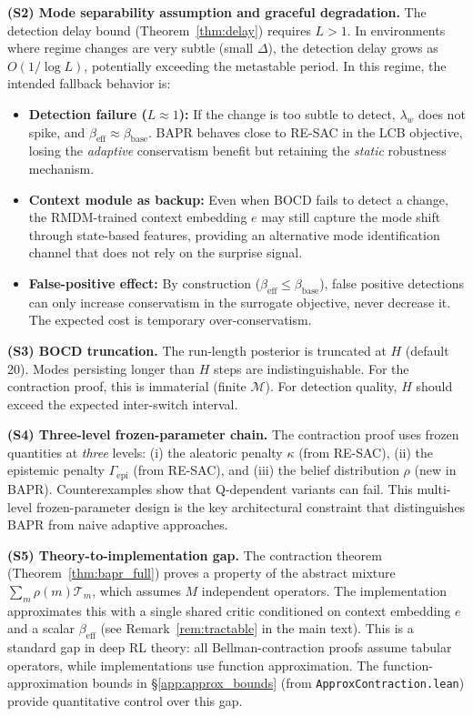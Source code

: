 \medskip
\noindent\textbf{(S2) Mode separability assumption and graceful degradation.}
The detection delay bound (Theorem~\ref{thm:delay}) requires $L > 1$. In environments where regime changes are very subtle (small $\Delta$), the detection delay grows as $O(1/\log L)$, potentially exceeding the metastable period. In this regime, the intended fallback behavior is:
\begin{itemize}
    \item \textbf{Detection failure ($L \approx 1$):} If the change is too subtle to detect, $\lambda_w$ does not spike, and $\beta_{\text{eff}} \approx \beta_{\text{base}}$. BAPR behaves close to RE-SAC in the LCB objective, losing the \emph{adaptive} conservatism benefit but retaining the \emph{static} robustness mechanism.
    \item \textbf{Context module as backup:} Even when BOCD fails to detect a change, the RMDM-trained context embedding $e$ may still capture the mode shift through state-based features, providing an alternative mode identification channel that does not rely on the surprise signal.
    \item \textbf{False-positive effect:} By construction ($\beta_{\text{eff}} \leq \beta_{\text{base}}$), false positive detections can only increase conservatism in the surrogate objective, never decrease it. The expected cost is temporary over-conservatism.
\end{itemize}

\medskip
\noindent\textbf{(S3) BOCD truncation.}
The run-length posterior is truncated at $H$ (default 20). Modes persisting longer than $H$ steps are indistinguishable. For the contraction proof, this is immaterial (finite $\mathcal{M}$). For detection quality, $H$ should exceed the expected inter-switch interval.

\medskip
\noindent\textbf{(S4) Three-level frozen-parameter chain.}
The contraction proof uses frozen quantities at \emph{three} levels: (i) the aleatoric penalty $\kappa$ (from RE-SAC), (ii) the epistemic penalty $\Gamma_{\text{epi}}$ (from RE-SAC), and (iii) the belief distribution $\rho$ (new in BAPR). Counterexamples show that Q-dependent variants can fail. This multi-level frozen-parameter design is the key architectural constraint that distinguishes BAPR from naive adaptive approaches.

\medskip
\noindent\textbf{(S5) Theory-to-implementation gap.}
The contraction theorem (Theorem~\ref{thm:bapr_full}) proves a property of the abstract mixture $\sum_m \rho(m) \mathcal{T}_m$, which assumes $M$ independent operators. The implementation approximates this with a single shared critic conditioned on context embedding $e$ and a scalar $\beta_{\text{eff}}$ (see Remark~\ref{rem:tractable} in the main text). This is a standard gap in deep RL theory: all Bellman-contraction proofs assume tabular operators, while implementations use function approximation. The function-approximation bounds in \S\ref{app:approx_bounds} (from \texttt{ApproxContraction.lean}) provide quantitative control over this gap.

